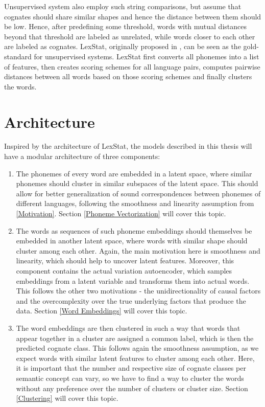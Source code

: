 \documentclass[6pt]{article}
\begin{document}
Unsupervised system also employ such string comparisons, but assume that cognates should share similar shapes and hence the distance between them should be low. Hence, after predefining some threshold, words with mutual distances beyond that threshold are labeled as unrelated, while words closer to each other are labeled as cognates.  LexStat, originally proposed in \cite{list2012lexstat}, can be seen as the gold-standard for unsupervised systems. LexStat first converts all phonemes into a list of features, then creates scoring schemes for all language pairs, computes pairwise distances between all words based on those scoring schemes and finally clusters the words. 


\section{Architecture}
Inspired by the architecture of LexStat, the models described in this thesis will have a modular architecture of three components:
\begin{enumerate}
\item The phonemes of every word are embedded in a latent space, where similar phonemes should cluster in similar subspaces of the latent space. This should allow for better generalization of sound correspondences between phonemes of different languages, following the smoothness and linearity assumption from \ref{Motivation}. Section \ref{Phoneme Vectorization} will cover this topic.
\item The words as sequences of such phoneme embeddings should themselves be embedded in another latent space, where words with similar shape should cluster among each other.  Again, the main motivation here is smoothness and linearity, which should help to uncover latent features. Moreover, this component contains the actual variation autoencoder, which samples embeddings from a latent variable and transforms them into actual words. This follows the other two motivations - the unidirectionality of causal factors and the overcomplexity over the true underlying factors that produce the data. Section \ref{Word Embeddings} will cover this topic.
\item The word embeddings are then clustered in such a way that words that appear together in a cluster are assigned a common label, which is then the predicted cognate class.  This follows again the smoothness assumption, as we expect words with similar latent features to cluster among each other. Here, it is important that the number and respective size of cognate classes per semantic concept can vary, so we have to find a way to cluster the words without any preference over the number of clusters or cluster size. Section \ref{Clustering} will cover this topic.

\end{enumerate}
\end{document}
